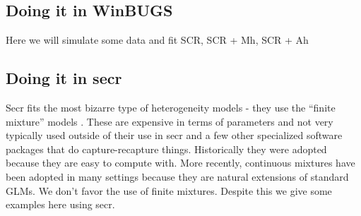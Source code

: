 \subsection{Doing it in WinBUGS}
Here we will simulate some data and fit SCR, SCR + Mh, SCR + Ah

\subsection{Doing it in secr}

Secr fits the most bizarre type of heterogeneity models - they use the
``finite mixture'' models \citep{norris_pollock:1996, pledger:2000}. These are expensive in terms of parameters and not very typically used outside of their use in secr and a few other specialized software packages that do capture-recapture things. Historically they were adopted because they are easy to compute with. More recently, continuous mixtures have been adopted in many settings because they are natural extensions of standard GLMs. We don't favor the use of finite mixtures. Despite this we give some examples here using secr.